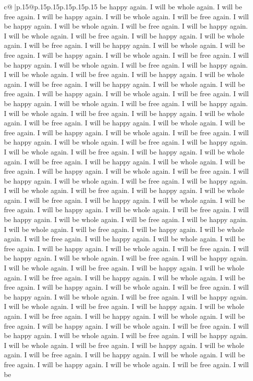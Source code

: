 \documentclass{article}
\begin{document}
{\begin{supertabular}{c@{$\;$}|p{.15\linewidth}@{}p{.15\linewidth}p{.15\linewidth}p{.15\linewidth}p{.15\linewidth}p{.15\linewidth}}
{{{be happy again. I will be whole again. I will be free again. I will be happy again. I will be whole again. I will be free again. I will be happy again. I will be whole again. I will be free again. I will be happy again. I will be whole again. I will be free again. I will be happy again. I will be whole again. I will be free again. I will be happy again. I will be whole again. I will be free again. I will be happy again. I will be whole again. I will be free again. I will be happy again. I will be whole again. I will be free again. I will be happy again. I will be whole again. I will be free again. I will be happy again. I will be whole again. I will be free again. I will be happy again. I will be whole again. I will be free again. I will be happy again. I will be whole again. I will be free again. I will be happy again. I will be whole again. I will be free again. I will be happy again. I will be whole again. I will be free again. I will be happy again. I will be whole again. I will be free again. I will be happy again. I will be whole again. I will be free again. I will be happy again. I will be whole again. I will be free again. I will be happy again. I will be whole again. I will be free again. I will be happy again. I will be whole again. I will be free again. I will be happy again. I will be whole again. I will be free again. I will be happy again. I will be whole again. I will be free again. I will be happy again. I will be whole again. I will be free again. I will be happy again. I will be whole again. I will be free again. I will be happy again. I will be whole again. I will be free again. I will be happy again. I will be whole again. I will be free again. I will be happy again. I will be whole again. I will be free again. I will be happy again. I will be whole again. I will be free again. I will be happy again. I will be whole again. I will be free again. I will be happy again. I will be whole again. I will be free again. I will be happy again. I will be whole again. I will be free again. I will be happy again. I will be whole again. I will be free again. I will be happy again. I will be whole again. I will be free again. I will be happy again. I will be whole again. I will be free again. I will be happy again. I will be whole again. I will be free again. I will be happy again. I will be whole again. I will be free again. I will be happy again. I will be whole again. I will be free again. I will be happy again. I will be whole again. I will be free again. I will be happy again. I will be whole again. I will be free again. I will be happy again. I will be whole again. I will be free again. I will be happy again. I will be whole again. I will be free again. I will be happy again. I will be whole again. I will be free again. I will be happy again. I will be whole again. I will be free again. I will be happy again. I will be whole again. I will be free again. I will be happy again. I will be whole again. I will be free again. I will be happy again. I will be whole again. I will be free again. I will be happy again. I will be whole again. I will be free again. I will be happy again. I will be whole again. I will be free again. I will be }}}
\end{supertabular}}
\end{document}
